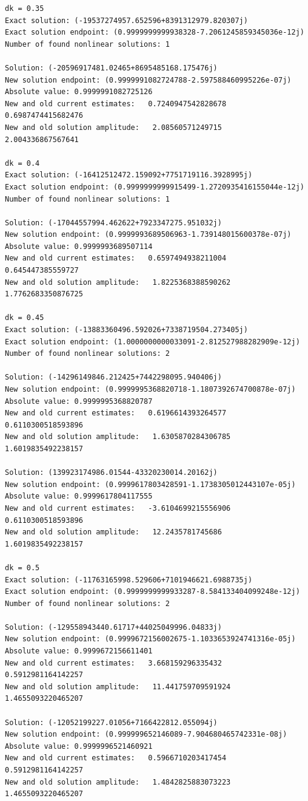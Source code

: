 \documentclass{article}
\begin{document}
\begin{verbatim}
dk = 0.35
Exact solution: (-19537274957.652596+8391312979.820307j)
Exact solution endpoint: (0.9999999999938328-7.2061245859345036e-12j)
Number of found nonlinear solutions: 1

Solution: (-20596917481.02465+8695485168.175476j)
New solution endpoint: (0.9999991082724788-2.597588460995226e-07j) Absolute value: 0.9999991082725126
New and old current estimates:   0.7240947542828678    0.6987474415682476
New and old solution amplitude:   2.08560571249715    2.004336867567641

dk = 0.4
Exact solution: (-16412512472.159092+7751719116.3928995j)
Exact solution endpoint: (0.9999999999915499-1.2720935416155044e-12j)
Number of found nonlinear solutions: 1

Solution: (-17044557994.462622+7923347275.951032j)
New solution endpoint: (0.9999993689506963-1.739148015600378e-07j) Absolute value: 0.9999993689507114
New and old current estimates:   0.6597494938211004    0.645447385559727
New and old solution amplitude:   1.8225368388590262    1.7762683350876725

dk = 0.45
Exact solution: (-13883360496.592026+7338719504.273405j)
Exact solution endpoint: (1.0000000000033091-2.812527988282909e-12j)
Number of found nonlinear solutions: 2

Solution: (-14296149846.212425+7442298095.940406j)
New solution endpoint: (0.9999995368820718-1.1807392674700878e-07j) Absolute value: 0.9999995368820787
New and old current estimates:   0.6196614393264577    0.6110300518593896
New and old solution amplitude:   1.6305870284306785    1.6019835492238157

Solution: (139923174986.01544-43320230014.20162j)
New solution endpoint: (0.9999617803428591-1.1738305012443107e-05j) Absolute value: 0.9999617804117555
New and old current estimates:   -3.6104699215556906    0.6110300518593896
New and old solution amplitude:   12.2435781745686    1.6019835492238157

dk = 0.5
Exact solution: (-11763165998.529606+7101946621.6988735j)
Exact solution endpoint: (0.9999999999933287-8.584133404099248e-12j)
Number of found nonlinear solutions: 2

Solution: (-129558943440.61717+44025049996.04833j)
New solution endpoint: (0.9999672156002675-1.1033653924741316e-05j) Absolute value: 0.9999672156611401
New and old current estimates:   3.668159296335432    0.5912981164142257
New and old solution amplitude:   11.441759709591924    1.4655093220465207

Solution: (-12052199227.01056+7166422812.055094j)
New solution endpoint: (0.999999652146089-7.904680465742331e-08j) Absolute value: 0.9999996521460921
New and old current estimates:   0.5966710203417454    0.5912981164142257
New and old solution amplitude:   1.4842825883073223    1.4655093220465207


\end{verbatim}
\end{document}
